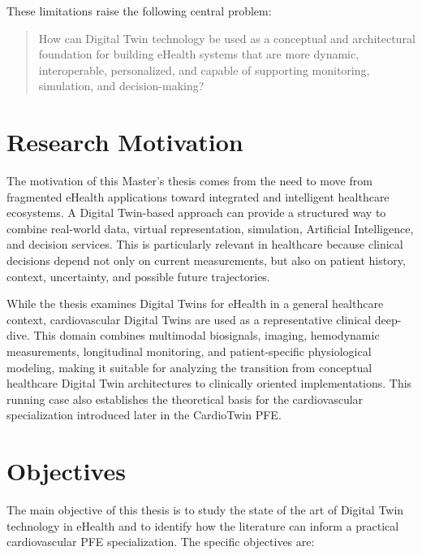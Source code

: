 These limitations raise the following central problem:

\begin{quote}
How can Digital Twin technology be used as a conceptual and architectural foundation for building eHealth systems that are more dynamic, interoperable, personalized, and capable of supporting monitoring, simulation, and decision-making?
\end{quote}

\section{Research Motivation}
The motivation of this Master’s thesis comes from the need to move from fragmented eHealth applications toward integrated and intelligent healthcare ecosystems. A Digital Twin-based approach can provide a structured way to combine real-world data, virtual representation, simulation, Artificial Intelligence, and decision services. This is particularly relevant in healthcare because clinical decisions depend not only on current measurements, but also on patient history, context, uncertainty, and possible future trajectories.

While the thesis examines Digital Twins for eHealth in a general healthcare context, cardiovascular Digital Twins are used as a representative clinical deep-dive. This domain combines multimodal biosignals, imaging, hemodynamic measurements, longitudinal monitoring, and patient-specific physiological modeling, making it suitable for analyzing the transition from conceptual healthcare Digital Twin architectures to clinically oriented implementations. This running case also establishes the theoretical basis for the cardiovascular specialization introduced later in the CardioTwin PFE.

\section{Objectives}
The main objective of this thesis is to study the state of the art of Digital Twin technology in eHealth and to identify how the literature can inform a practical cardiovascular PFE specialization. The specific objectives are:

